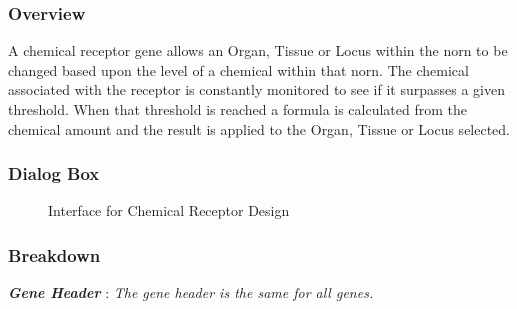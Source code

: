 \documentclass[11pt,twoside,a4paper]{article}
\begin{document}
\begin{minipage}{0.5\linewidth}
\subsubsection{Overview}
A chemical receptor gene allows an Organ, Tissue or Locus within the norn to be changed based upon the level of a chemical within that norn. The chemical associated with the receptor is constantly monitored to see if it surpasses a given threshold. When that threshold is reached a formula is calculated from the chemical amount and the result is applied to the Organ, Tissue or Locus selected.
\end{minipage}
\begin{minipage}{0.1\linewidth}\end{minipage}
\begin{minipage}{0.4\linewidth}
\subsubsection{Dialog Box}
\begin{figure}[H]
	\centerline {} %
	\caption{Interface for Chemical Receptor Design}
	\label{fig:chemical_receptor}
\end{figure}
\end{minipage}

\subsubsection{Breakdown}

\textbf{\textit{Gene Header}} : \emph{The gene header is the same for all genes. }~\\


\end{document}
